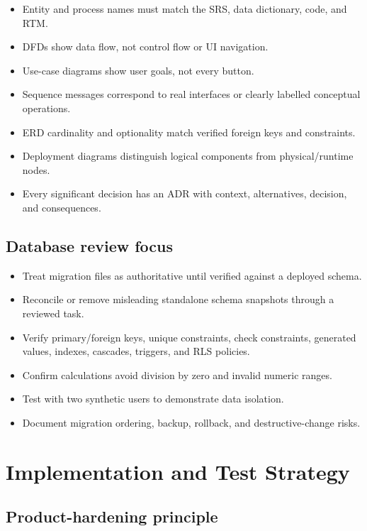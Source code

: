 \documentclass[
  10pt,
  a4paper,
  oneside]{report}
\providecommand{\tightlist}{%
  \setlength{\itemsep}{0pt}\setlength{\parskip}{0pt}}
\begin{document}
\begin{itemize}
\tightlist
\item
  Entity and process names must match the SRS, data dictionary, code,
  and RTM.
\item
  DFDs show data flow, not control flow or UI navigation.
\item
  Use-case diagrams show user goals, not every button.
\item
  Sequence messages correspond to real interfaces or clearly labelled
  conceptual operations.
\item
  ERD cardinality and optionality match verified foreign keys and
  constraints.
\item
  Deployment diagrams distinguish logical components from
  physical/runtime nodes.
\item
  Every significant decision has an ADR with context, alternatives,
  decision, and consequences.
\end{itemize}

\section{Database review focus}\label{154-database-review-focus}

\begin{itemize}
\tightlist
\item
  Treat migration files as authoritative until verified against a
  deployed schema.
\item
  Reconcile or remove misleading standalone schema snapshots through a
  reviewed task.
\item
  Verify primary/foreign keys, unique constraints, check constraints,
  generated values, indexes, cascades, triggers, and RLS policies.
\item
  Confirm calculations avoid division by zero and invalid numeric
  ranges.
\item
  Test with two synthetic users to demonstrate data isolation.
\item
  Document migration ordering, backup, rollback, and destructive-change
  risks.
\end{itemize}

\chapter{Implementation and Test
Strategy}\label{16-implementation-and-test-strategy}

\section{Product-hardening
principle}\label{161-product-hardening-principle}
\end{document}
